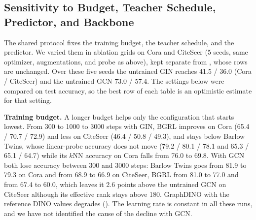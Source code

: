 \documentclass[conference]{IEEEtran}
\begin{document}
\subsection{Sensitivity to Budget, Teacher Schedule, Predictor, and Backbone}
\label{sec:sensitivity}
The shared protocol fixes the training budget, the teacher schedule, and the predictor. We varied them in ablation grids on Cora and CiteSeer (5 seeds, same optimizer, augmentations, and probe as above), kept separate from , whose rows are unchanged. Over these five seeds the untrained GIN reaches 41.5 / 36.0 (Cora / CiteSeer) and the untrained GCN 73.0 / 57.4. The settings below were compared on test accuracy, so the best row of each table is an optimistic estimate for that setting.

\textbf{Training budget.} A longer budget helps only the configuration that starts lowest. From 300 to 1000 to 3000 steps with GIN, BGRL improves on Cora (65.4 / 70.7 / 72.9) and less on CiteSeer (46.4 / 50.8 / 49.3), and stays below Barlow Twins, whose linear-probe accuracy does not move (79.2 / 80.1 / 78.1 and 65.3 / 65.1 / 64.7) while its $k$NN accuracy on Cora falls from 76.0 to 69.8. With GCN both lose accuracy between 300 and 3000 steps: Barlow Twins goes from 81.9 to 79.3 on Cora and from 68.9 to 66.9 on CiteSeer, BGRL from 81.0 to 77.0 and from 67.4 to 60.0, which leaves it 2.6 points above the untrained GCN on CiteSeer although its effective rank stays above 180. GraphDINO with the reference DINO values degrades (). The learning rate is constant in all these runs, and we have not identified the cause of the decline with GCN.
\end{document}
